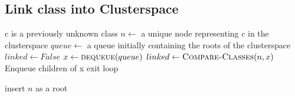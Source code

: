 \documentclass[conference]{IEEEtran}
\begin{document}
\subsection{Link class into Clusterspace}
\label{cs-link-class}
\begin{algorithmic}
        \Require c is a previously unknown class
        \State $n\gets $ a unique node representing $c$ in the clusterspace
        \State $queue\gets $ a queue initially containing the roots of the clusterspace
        \State $linked\gets False$
        \State $x\gets \Call{dequeue}{queue}$
            \State $linked\gets \Call{Compare-Classes}{n,x}$
                \State Enqueue children of x
            \Else
                exit loop
            \EndIf
        \EndWhile

            \State insert $n$ as a root
        \EndIf
    \EndFunction
\end{algorithmic}
\end{document}
